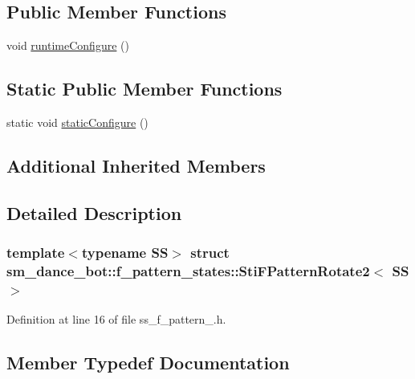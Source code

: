 \subsection*{Public Member Functions}
\begin{DoxyCompactItemize}
\item 
void \hyperlink{classsm__dance__bot_1_1f__pattern__states_1_1StiFPatternRotate2_a5fe706854d8d6cf46f38677d7e47935b}{runtime\+Configure} ()
\end{DoxyCompactItemize}
\subsection*{Static Public Member Functions}
\begin{DoxyCompactItemize}
\item 
static void \hyperlink{classsm__dance__bot_1_1f__pattern__states_1_1StiFPatternRotate2_a8c67fc674ad24995580cb251d5660bf8}{static\+Configure} ()
\end{DoxyCompactItemize}
\subsection*{Additional Inherited Members}


\subsection{Detailed Description}
\subsubsection*{template$<$typename SS$>$\newline
struct sm\+\_\+dance\+\_\+bot\+::f\+\_\+pattern\+\_\+states\+::\+Sti\+F\+Pattern\+Rotate2$<$ S\+S $>$}



Definition at line 16 of file ss\+\_\+f\+\_\+pattern\+\_.\+h.



\subsection{Member Typedef Documentation}
\mbox{\label{classsm__dance__bot_1_1f__pattern__states_1_1StiFPatternRotate2_a89ab40aa874fa9b386c490af512ab0c0}} 
